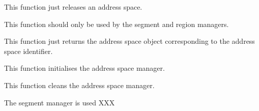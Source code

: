 
This function just releases an address space.


This function should only be used by the segment and region managers.

This function just returns the address space object corresponding to
the address space identifier.


This function initialises the address space manager.


This function cleans the address space manager.

%
%

The segment manager is used XXX

%
%

%
%

%
%

%
%




